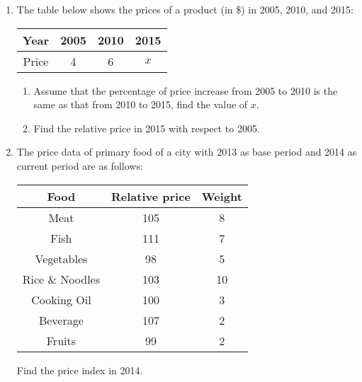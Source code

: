 \documentclass{report}
\begin{document}
\begin{multicols}{2}
\begin{enumerate}
    \item The table below shows the prices of a product (in \$) in 2005, 2010, and 2015:
          \begin{center}
            \begin{tabular}{|c|c|c|c|}
              \hline
              Year  & 2005 & 2010 & 2015 \\
              \hline
              Price & 4    & 6    & $x$  \\
              \hline
            \end{tabular}
          \end{center}
          \begin{enumerate}
            \item Assume that the percentage of price increase from 2005 to 2010 is the same as
                  that from 2010 to 2015, find the value of $x$.
            \item Find the relative price in 2015 with respect to 2005.
          \end{enumerate}

    \item The price data of primary food of a city with 2013 as base period and 2014 as
          current period are as follows:
          \begin{center}
            \begin{tabular}{|c|c|c|}
              \hline
              Food                   & Relative price & Weight \\
              \hline
              Meat                   & 105            & 8      \\
              Fish                   & 111            & 7      \\
              Vegetables             & 98             & 5      \\
              Rice        \& Noodles & 103            & 10     \\
              Cooking Oil            & 100            & 3      \\
              Beverage               & 107            & 2      \\
              Fruits                 & 99             & 2      \\
              \hline
            \end{tabular}
          \end{center}
          Find the price index in 2014.


\end{enumerate}
\end{multicols}
\end{document}
